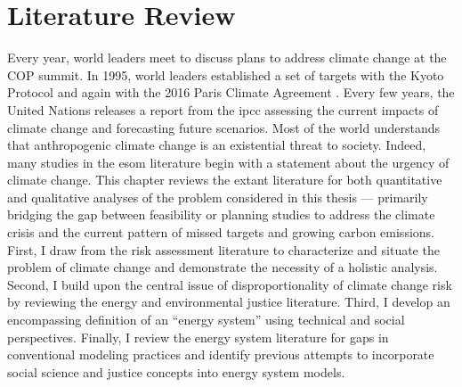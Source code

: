 \chapter{Literature Review}
\label{chapter:lit-review}
Every year, world leaders meet to discuss plans to address climate change at the
COP summit. In 1995, world leaders established a set of targets with the Kyoto
Protocol \cite{united_nations_kyoto_1998} and again with the 2016 Paris Climate
Agreement \cite{united_nations_paris_2015}. Every few years, the United Nations
releases a report from the \ac{ipcc} assessing the current impacts of climate
change and forecasting future scenarios. Most of the world understands that
anthropogenic climate change is an existential threat to society. Indeed, many
studies in the \ac{esom} literature begin with a statement about the urgency of
climate change. This chapter reviews the extant literature for both quantitative
and qualitative analyses of the problem considered in this thesis --- primarily
bridging the gap between feasibility or planning studies to address the climate
crisis and the current pattern of missed targets and growing carbon emissions.
First, I draw from the risk assessment literature to characterize and situate
the problem of climate change and demonstrate the necessity of a holistic
analysis. Second, I build upon the central issue of disproportionality of
climate change risk by reviewing the energy and environmental justice
literature. Third, I develop an encompassing definition of an ``energy system''
using technical and social perspectives. Finally, I review the energy system
literature for gaps in conventional modeling practices and identify previous
attempts to incorporate social science and justice concepts into energy system
models.



%  
% 




